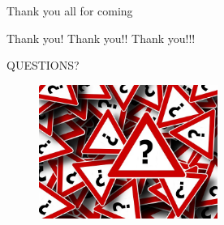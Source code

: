 \documentclass[english,12pt,presentation]{beamer}
\begin{document}
\begin{frame}{Thank you all for coming}
\item Thank you! Thank you!! Thank you!!!
\end{frame}

\begin{frame}{QUESTIONS?}
\begin{figure}
\centering
\includegraphics[width=220]{images/q.png}
\end{figure}
\end{frame}
\end{document}
